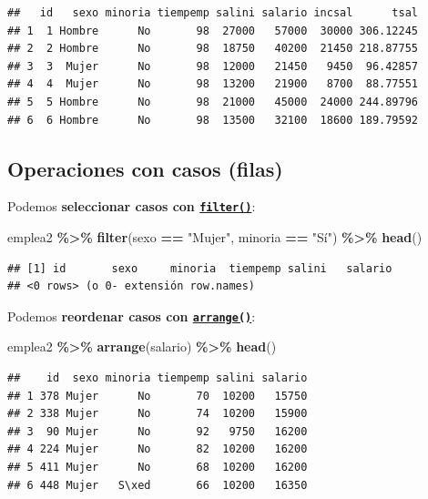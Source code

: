 \documentclass[
]{book}
\newenvironment{Shaded}{\begin{snugshade}}{\end{snugshade}}
\newcommand{\FunctionTok}[1]{\textcolor[rgb]{0.13,0.29,0.53}{\textbf{#1}}}
\newcommand{\NormalTok}[1]{#1}
\newcommand{\SpecialCharTok}[1]{\textcolor[rgb]{0.81,0.36,0.00}{\textbf{#1}}}
\newcommand{\StringTok}[1]{\textcolor[rgb]{0.31,0.60,0.02}{#1}}
\theoremstyle{break}
\theoremstyle{nonumberplain}
\begin{document}
\begin{verbatim}
##   id   sexo minoria tiempemp salini salario incsal      tsal
## 1  1 Hombre      No       98  27000   57000  30000 306.12245
## 2  2 Hombre      No       98  18750   40200  21450 218.87755
## 3  3  Mujer      No       98  12000   21450   9450  96.42857
## 4  4  Mujer      No       98  13200   21900   8700  88.77551
## 5  5 Hombre      No       98  21000   45000  24000 244.89796
## 6  6 Hombre      No       98  13500   32100  18600 189.79592
\end{verbatim}

\subsection{Operaciones con casos (filas)}\label{dplyr-casos}

Podemos \textbf{seleccionar casos con \href{https://dplyr.tidyverse.org/reference/filter.html}{\texttt{filter()}}}:

\begin{Shaded}
\begin{Highlighting}[]
\NormalTok{emplea2 }\SpecialCharTok{\%\textgreater{}\%} \FunctionTok{filter}\NormalTok{(sexo }\SpecialCharTok{==} \StringTok{"Mujer"}\NormalTok{, minoria }\SpecialCharTok{==} \StringTok{"Sí"}\NormalTok{) }\SpecialCharTok{\%\textgreater{}\%} \FunctionTok{head}\NormalTok{()}
\end{Highlighting}
\end{Shaded}

\begin{verbatim}
## [1] id       sexo     minoria  tiempemp salini   salario 
## <0 rows> (o 0- extensión row.names)
\end{verbatim}

Podemos \textbf{reordenar casos con \href{https://dplyr.tidyverse.org/reference/arrange.html}{\texttt{arrange()}}}:

\begin{Shaded}
\begin{Highlighting}[]
\NormalTok{emplea2 }\SpecialCharTok{\%\textgreater{}\%} \FunctionTok{arrange}\NormalTok{(salario) }\SpecialCharTok{\%\textgreater{}\%} \FunctionTok{head}\NormalTok{()}
\end{Highlighting}
\end{Shaded}

\begin{verbatim}
##    id  sexo minoria tiempemp salini salario
## 1 378 Mujer      No       70  10200   15750
## 2 338 Mujer      No       74  10200   15900
## 3  90 Mujer      No       92   9750   16200
## 4 224 Mujer      No       82  10200   16200
## 5 411 Mujer      No       68  10200   16200
## 6 448 Mujer   S\xed       66  10200   16350
\end{verbatim}
\end{document}
